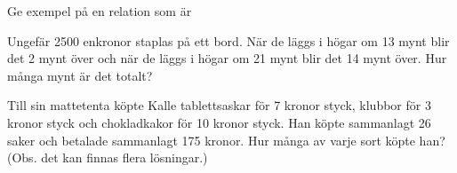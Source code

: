 \documentclass{exam}
\begin{document}
\begin{questions}
Ge exempel på en relation som är 
\vspace{0.25in}

Ungefär 2500 enkronor staplas på ett bord. När de läggs i högar om 13 mynt blir det 2 mynt över och när de läggs i högar om 21 mynt blir det 14 mynt över. Hur många mynt är det totalt?
\vspace{0.25in}

Till sin mattetenta köpte Kalle tablettsaskar för 7 kronor styck, klubbor för 3 kronor styck och chokladkakor för 10 kronor styck. Han köpte sammanlagt 26 saker och betalade sammanlagt 175 kronor. Hur många av varje sort köpte han? (Obs. det kan finnas flera lösningar.)

\vspace{0.25in}




\end{questions}
\end{document}
